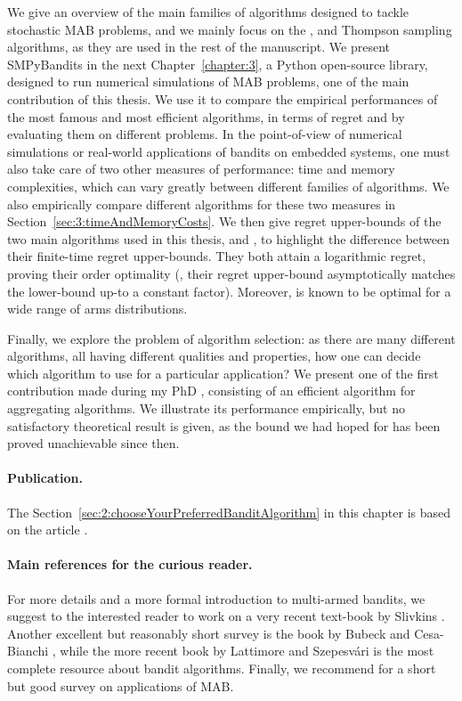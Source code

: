 We give an overview of the main families of algorithms designed to tackle stochastic MAB problems, and we mainly focus on the \UCB, \klUCB{} and Thompson sampling algorithms, as they are used in the rest of the manuscript.
We present SMPyBandits in the next Chapter~\ref{chapter:3}, a Python open-source library, designed to run numerical simulations of MAB problems, one of the main contribution of this thesis. We use it to compare the empirical performances of the most famous and most efficient algorithms, in terms of regret and by evaluating them on different problems.
%
In the point-of-view of numerical simulations or real-world applications of bandits on embedded systems, one must also take care of two other measures of performance: time and memory complexities, which can vary greatly between different families of algorithms.
We also empirically compare different algorithms for these two measures in Section~\ref{sec:3:timeAndMemoryCosts}.
%
We then give regret upper-bounds of the two main algorithms used in this thesis, \UCB{} and \klUCB, to highlight the difference between their finite-time regret upper-bounds. They both attain a logarithmic regret, proving their order optimality (\ie, their regret upper-bound asymptotically matches the lower-bound up-to a constant factor). Moreover, \klUCB{} is known to be optimal for a wide range of arms distributions.

Finally, we explore the problem of algorithm selection: as there are many different algorithms, all having different qualities and properties, how one can decide which algorithm to use for a particular application?
We present one of the first contribution made during my PhD \cite{Besson2018WCNC}, consisting of an efficient algorithm for aggregating algorithms.
We illustrate its performance empirically, but no satisfactory theoretical result is given, as the bound we had hoped for has been proved unachievable since then.


\paragraph{Publication.}
%
The Section~\ref{sec:2:chooseYourPreferredBanditAlgorithm} in this chapter is based on the article \cite{Besson2018WCNC}.


\paragraph{Main references for the curious reader.}
%
For more details and a more formal introduction to multi-armed bandits, we suggest to the interested reader to work on a very recent text-book by Slivkins \cite{Slivkins2019}.
Another excellent but reasonably short survey is the book by Bubeck and Cesa-Bianchi \cite{Bubeck12}, while the more recent book by Lattimore and Szepesv{\'a}ri \cite{LattimoreBanditAlgorithmsBook} is the most complete resource about bandit algorithms.
Finally, we recommend \cite{bouneffouf2019survey} for a short but good survey on applications of MAB.

